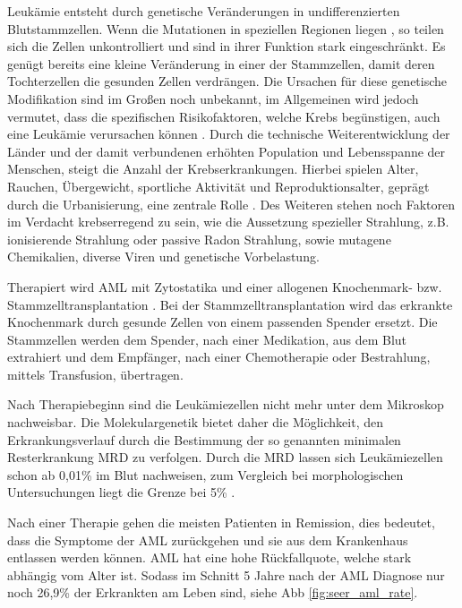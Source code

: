 Leukämie entsteht durch genetische Veränderungen in undifferenzierten Blutstammzellen. Wenn die Mutationen in speziellen Regionen liegen \cite{Wakita.2016}, so teilen sich die Zellen unkontrolliert und sind in ihrer Funktion stark eingeschränkt. Es genügt bereits eine kleine Veränderung in einer der Stammzellen, damit deren Tochterzellen die gesunden Zellen verdrängen. Die Ursachen für diese genetische Modifikation sind im Großen noch unbekannt, im Allgemeinen wird jedoch vermutet, dass die spezifischen Risikofaktoren, welche Krebs begünstigen, auch eine Leukämie verursachen können \cite{Petit.2014}. Durch die technische Weiterentwicklung der Länder und der damit verbundenen erhöhten Population und Lebensspanne der Menschen, steigt die Anzahl der Krebserkrankungen. Hierbei spielen Alter, Rauchen, Übergewicht, sportliche Aktivität und Reproduktionsalter, geprägt durch die Urbanisierung, eine zentrale Rolle \cite{Torre.2015}. Des Weiteren stehen noch Faktoren im Verdacht krebserregend zu sein, wie die Aussetzung spezieller Strahlung, z.B. ionisierende Strahlung oder passive Radon Strahlung, sowie mutagene Chemikalien, diverse Viren und genetische Vorbelastung.

Therapiert wird \ac{AML} mit Zytostatika und einer allogenen Knochenmark- bzw. Stammzelltransplantation \cite{Cheson.2003}. Bei der Stamm\-zell\-trans\-plan\-tat\-ion wird das erkrankte Knochenmark durch gesunde Zellen von einem passenden Spender ersetzt. Die Stammzellen werden dem Spender, nach einer Medikation, aus dem Blut extrahiert und dem Empfänger, nach einer Chemotherapie oder Bestrahlung, mittels Transfusion, übertragen. 

Nach Therapiebeginn sind die Leukämiezellen nicht mehr unter dem Mikroskop nachweisbar. Die Molekulargenetik bietet daher die Möglichkeit, den Erkrankungsverlauf durch die Bestimmung der so genannten minimalen Resterkrankung \ac{MRD} zu verfolgen. Durch die \ac{MRD} lassen sich Leukämiezellen schon ab 0,01\% im Blut nachweisen, zum Vergleich bei morphologischen Untersuchungen liegt die Grenze bei 5\% \cite{Ossenkoppele.2016}.

Nach einer Therapie gehen die meisten Patienten in Remission, dies bedeutet, dass die Symptome der \ac{AML} zurückgehen und sie aus dem Krankenhaus entlassen werden können. \ac{AML} hat eine hohe Rückfallquote, welche stark abhängig vom Alter ist. Sodass im Schnitt 5 Jahre nach der \ac{AML} Diagnose nur noch 26,9\% der Erkrankten am Leben sind, siehe \ac{Abb} \ref{fig:seer_aml_rate}.

